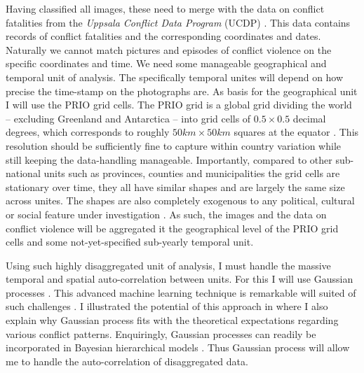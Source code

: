 \documentclass[a4paper]{article}
\begin{document}
Having classified all images, these need to merge with the data on conflict fatalities from the \emph{Uppsala Conflict Data Program} (UCDP) \citep{Sundberg_2013, Croicu_Sundberg_2017, UCDP_2017}. This data contains records of conflict fatalities and the corresponding coordinates and dates. Naturally we cannot match pictures and episodes of conflict violence on the specific coordinates and time. We need some manageable geographical and temporal unit of analysis. The specifically temporal unites will depend on how precise the time-stamp on the photographs are. As basis for the geographical unit I will use the PRIO grid cells. The PRIO grid is a global grid dividing the world -- excluding Greenland and Antarctica -- into grid cells of $0.5 \times 0.5$ decimal degrees, which corresponds to roughly $50km\times50km$ squares at the equator \citep[367]{Tollefsen_2012}. This resolution should be sufficiently fine to capture within country variation while still keeping the data-handling manageable. Importantly, compared to other sub-national units such as provinces, counties and municipalities the grid cells are stationary over time, they all have similar shapes and are largely the same size across unites. The shapes are also completely exogenous to any political, cultural or social feature under investigation \citep[356]{Tollefsen_2012}. As such, the images and the data on conflict violence will be aggregated it the geographical level of the PRIO grid cells and some not-yet-specified sub-yearly temporal unit.\par

Using such highly disaggregated unit of analysis, I must handle the massive temporal and spatial auto-correlation between units. For this I will use Gaussian processes \citep{williams2006gaussian}. This advanced machine learning technique is remarkable will suited of such challenges \citep{Gelman_2013, gelfand2016spatial, Mcelreath_2018, SPECIALE}. I illustrated the potential of this approach in \cite{SPECIALE} where I also explain why Gaussian process fits with the theoretical expectations regarding various conflict patterns\citep[22-27]{SPECIALE}. Enquiringly, Gaussian processes can readily be incorporated in Bayesian hierarchical models \citep[410-419]{Mcelreath_2018}. Thus Gaussian process will allow me to handle the auto-correlation of disaggregated data.\par

\end{document}
